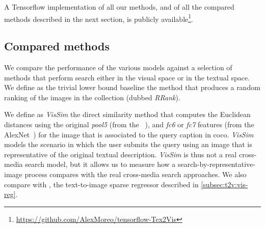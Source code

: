 
A Tensorflow implementation of all our methods, and of all the compared methods described in the next section, is publicly available\footnote{\url{https://github.com/AlexMoreo/tensorflow-Tex2Vis}}.

\subsection{Compared methods}
\label{subsec:t2v:compared-methods}

We compare the performance of the various \ttv{} models against a selection of methods that perform search either in the visual space or in the textual space.
We define as the trivial lower bound baseline the method that produces a random ranking of the images in the collection (dubbed \emph{RRank}).

We define as \emph{VisSim} the direct similarity method that computes the Euclidean distances using the original \emph{pool5} (from the \resnet{}~\cite{he2016deep}), and \emph{fc6} or \emph{fc7} features (from the AlexNet~\cite{zhou2014learning}) for the image that is associated to the query caption in \gls{coco}.
\emph{VisSim} models the scenario in which the user submits the query using an image that is representative of the original textual description.
\emph{VisSim} is thus not a real cross-media search model, but it allows us to measure how a search-by-representative-image process compares with the real cross-media search approaches.
We also compare with \visreg{}, the text-to-image sparse regressor described in \ref{subsec:t2v:vis-reg}.

